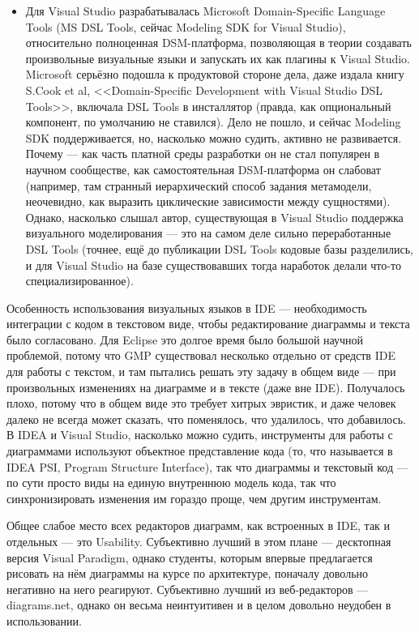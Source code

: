 \documentclass{text-style}
\begin{document}
\begin{itemize}
\begin{itemize}
        \item Для Visual Studio разрабатывалась Microsoft Domain-Specific Language Tools (MS DSL Tools, сейчас Modeling SDK for Visual Studio), относительно полноценная DSM-платформа, позволяющая в теории создавать произвольные визуальные языки и запускать их как плагины к Visual Studio. Microsoft серьёзно подошла к продуктовой стороне дела, даже издала книгу S.Cook et al, <<Domain-Specific Development with Visual Studio DSL Tools>>, включала DSL Tools в инсталлятор (правда, как опциональный компонент, по умолчанию не ставился). Дело не пошло, и сейчас Modeling SDK поддерживается, но, насколько можно судить, активно не развивается. Почему --- как часть платной среды разработки он не стал популярен в научном сообществе, как самостоятельная DSM-платформа он слабоват (например, там странный иерархический способ задания метамодели, неочевидно, как выразить циклические зависимости между сущностями). Однако, насколько слышал автор, существующая в Visual Studio поддержка визуального моделирования --- это на самом деле сильно переработанные DSL Tools (точнее, ещё до публикации DSL Tools кодовые базы разделились, и для Visual Studio на базе существовавших тогда наработок делали что-то специализированное).
    \end{itemize}
\end{itemize}


Особенность использования визуальных языков в IDE --- необходимость интеграции с кодом в текстовом виде, чтобы редактирование диаграммы и текста было согласовано. Для Eclipse это долгое время было большой научной проблемой, потому что GMP существовал несколько отдельно от средств IDE для работы с текстом, и там пытались решать эту задачу в общем виде --- при произвольных изменениях на диаграмме и в тексте (даже вне IDE). Получалось плохо, потому что в общем виде это требует хитрых эвристик, и даже человек далеко не всегда может сказать, что поменялось, что удалилось, что добавилось. В IDEA и Visual Studio, насколько можно судить, инструменты для работы с диаграммами используют объектное представление кода (то, что называется в IDEA PSI, Program Structure Interface), так что диаграммы и текстовый код --- по сути просто виды на единую внутреннюю модель кода, так что синхронизировать изменения им гораздо проще, чем другим инструментам.

Общее слабое место всех редакторов диаграмм, как встроенных в IDE, так и отдельных --- это Usability. Субъективно лучший в этом плане --- десктопная версия Visual Paradigm, однако студенты, которым впервые предлагается рисовать на нём диаграммы на курсе по архитектуре, поначалу довольно негативно на него реагируют. Субъективно лучший из веб-редакторов --- diagrams.net, однако он весьма неинтуитивен и в целом довольно неудобен в использовании.
\end{document}

